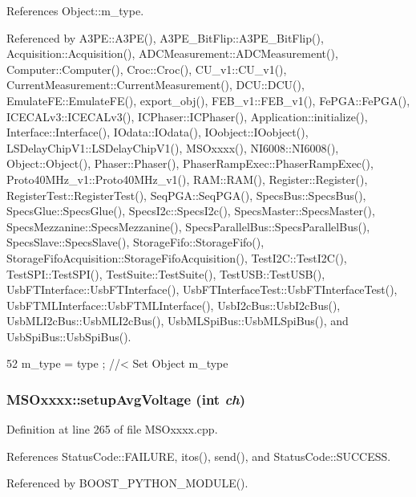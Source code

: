 References Object::m\_\-type.

Referenced by A3PE::A3PE(), A3PE\_\-BitFlip::A3PE\_\-BitFlip(), Acquisition::Acquisition(), ADCMeasurement::ADCMeasurement(), Computer::Computer(), Croc::Croc(), CU\_\-v1::CU\_\-v1(), CurrentMeasurement::CurrentMeasurement(), DCU::DCU(), EmulateFE::EmulateFE(), export\_\-obj(), FEB\_\-v1::FEB\_\-v1(), FePGA::FePGA(), ICECALv3::ICECALv3(), ICPhaser::ICPhaser(), Application::initialize(), Interface::Interface(), IOdata::IOdata(), IOobject::IOobject(), LSDelayChipV1::LSDelayChipV1(), MSOxxxx(), NI6008::NI6008(), Object::Object(), Phaser::Phaser(), PhaserRampExec::PhaserRampExec(), Proto40MHz\_\-v1::Proto40MHz\_\-v1(), RAM::RAM(), Register::Register(), RegisterTest::RegisterTest(), SeqPGA::SeqPGA(), SpecsBus::SpecsBus(), SpecsGlue::SpecsGlue(), SpecsI2c::SpecsI2c(), SpecsMaster::SpecsMaster(), SpecsMezzanine::SpecsMezzanine(), SpecsParallelBus::SpecsParallelBus(), SpecsSlave::SpecsSlave(), StorageFifo::StorageFifo(), StorageFifoAcquisition::StorageFifoAcquisition(), TestI2C::TestI2C(), TestSPI::TestSPI(), TestSuite::TestSuite(), TestUSB::TestUSB(), UsbFTInterface::UsbFTInterface(), UsbFTInterfaceTest::UsbFTInterfaceTest(), UsbFTMLInterface::UsbFTMLInterface(), UsbI2cBus::UsbI2cBus(), UsbMLI2cBus::UsbMLI2cBus(), UsbMLSpiBus::UsbMLSpiBus(), and UsbSpiBus::UsbSpiBus().


\begin{DoxyCode}
52 { m_type  = type  ; } //< Set Object m_type
\end{DoxyCode}
\hypertarget{classMSOxxxx_af1524bb099b5e559931704d13a1f1126}{
\subsubsection[{setupAvgVoltage}]{ MSOxxxx::setupAvgVoltage (int {\em ch})}}
\label{classMSOxxxx_af1524bb099b5e559931704d13a1f1126}


Definition at line 265 of file MSOxxxx.cpp.

References StatusCode::FAILURE, itos(), send(), and StatusCode::SUCCESS.

Referenced by BOOST\_\-PYTHON\_\-MODULE().


